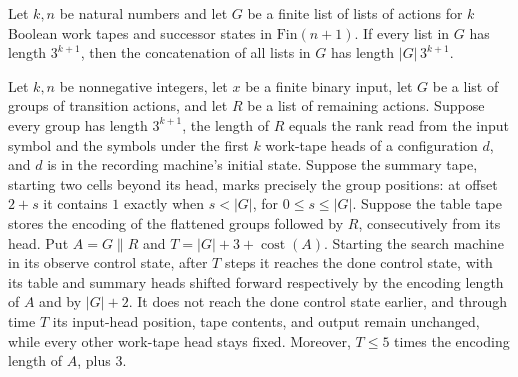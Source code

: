 \begin{lemma}
\label{Turing.StepBlock.groups_length}
\leanok
{}
Let $k,n$ be natural numbers and let $G$ be a finite list of lists of actions for $k$
Boolean work tapes and successor states in $\mathrm{Fin}(n+1)$. If every list in $G$ has
length $3^{k+1}$, then the concatenation of all lists in $G$ has length $|G|\,3^{k+1}$.
\end{lemma}

\begin{lemma}
\label{Turing.StepBlock.seekTM_lookup}
\leanok
{}
Let $k,n$ be nonnegative integers, let $x$ be a finite binary input, let $G$ be a list
of groups of transition actions, and let $R$ be a list of remaining actions. Suppose
every group has length $3^{k+1}$, the length of $R$ equals the rank read from the input
symbol and the symbols under the first $k$ work-tape heads of a configuration $d$, and
$d$ is in the recording machine's initial state. Suppose the summary tape, starting two
cells beyond its head, marks precisely the group positions: at offset $2+s$ it contains
$1$ exactly when $s<|G|$, for $0\le s\le |G|$. Suppose the table tape stores the
encoding of the flattened groups followed by $R$, consecutively from its head. Put
$A=G\mathbin{\|}R$ and $T=|G|+3+\operatorname{cost}(A)$. Starting the search machine in
its observe control state, after $T$ steps it reaches the done control state, with its
table and summary heads shifted forward respectively by the encoding length of $A$ and
by $|G|+2$. It does not reach the done control state earlier, and through time $T$ its
input-head position, tape contents, and output remain unchanged, while every other
work-tape head stays fixed. Moreover, $T\le 5$ times the encoding length of $A$, plus
$3$.
\end{lemma}

